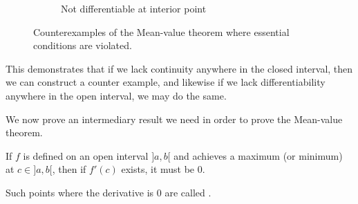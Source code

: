 \begin{figure}
\begin{subfigure}{0.3\textwidth}
		\centering
		\caption{Not differentiable at interior point}
	\end{subfigure}
	\caption{Counterexamples of the Mean-value theorem where essential conditions are violated.}
	\label{lec5:meanvalcounter}
\end{figure}


This demonstrates that if we lack continuity anywhere in the closed interval, then we can construct a counter example, and likewise if we lack differentiability anywhere in the open interval, we may do the same.

We now prove an intermediary result we need in order to prove the Mean-value theorem.

\begin{lemma}\label{lec5:criticalpoint}
	If $f$ is defined on an open interval ${]{a, b}[}$ and achieves a maximum (or minimum) at $c \in {]{a, b}[}$, then if $f'(c)$ exists, it must be $0$.
\end{lemma}

\noindent
Such points where the derivative is $0$ are called .

